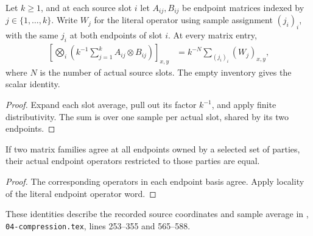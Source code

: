 \begin{theorem}
    \label{thm:peps_actual_endpoint_average}
    \leanok
    Let $k\geq1$, and at each source slot $i$ let $A_{ij},B_{ij}$ be
    endpoint matrices indexed by $j\in\{1,\ldots,k\}$. Write $W_j$ for
    the literal operator using sample assignment $(j_i)_i$, with the
    same $j_i$ at both endpoints of slot $i$. At every matrix entry,
    \begin{align}
        \left[\bigotimes_i\left(k^{-1}\sum_{j=1}^k
             A_{ij}\otimes B_{ij}\right)\right]_{x,y}
        &=k^{-N}\sum_{(j_i)_i}(W_j)_{x,y},
    \end{align}
    where $N$ is the number of actual source slots. The empty inventory
    gives the scalar identity.
\end{theorem}

\begin{proof}\leanok
    Expand each slot average, pull out its factor $k^{-1}$, and apply
    finite distributivity. The sum is over one sample per actual slot,
    shared by its two endpoints.
\end{proof}

\begin{theorem}
    \label{thm:peps_actual_endpoint_matrix_locality}
    \leanok
    If two matrix families agree at all endpoints owned by a selected
    set of parties, their actual endpoint operators restricted to those
    parties are equal.
\end{theorem}

\begin{proof}\leanok
    The corresponding operators in each endpoint basis agree.
    Apply locality of the literal endpoint operator word.
\end{proof}

These identities describe the recorded source coordinates and sample average
in \cite[proof of Theorem~5.2]{OpenAI2026PolynomialPEPS},
\texttt{04-compression.tex}, lines 253--355 and 565--588.
